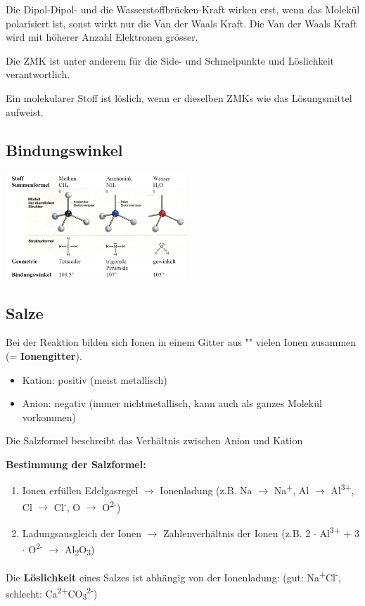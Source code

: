 \vspace{0.2cm}

Die Dipol-Dipol- und die Wasserstoffbrücken-Kraft wirken erst, wenn das Molekül polarisiert ist, sonst wirkt nur die Van der Waals Kraft.
Die Van der Waals Kraft wird mit höherer Anzahl Elektronen grösser.

Die ZMK ist unter anderem für die Side- und Schmelpunkte und Löslichkeit verantwortlich.

Ein molekularer Stoff ist löslich, wenn er dieselben ZMKs wie das Lösungsmittel aufweist.

\subsection{Bindungswinkel}
\begin{center}
	\includegraphics[height=4cm]{images/Winkel.png}
\end{center}


\subsection{Salze}
Bei der Reaktion bilden sich Ionen in einem Gitter aus "" vielen Ionen zusammen (= \textbf{Ionengitter}).
\begin{itemize}
	\item Kation: positiv (meist metallisch)
	\item Anion: negativ (immer nichtmetallisch, kann auch als ganzes Molekül vorkommen)
\end{itemize}

Die Salzformel beschreibt das Verhältnis zwischen Anion und Kation

\textbf{Bestimmung der Salzformel:}
\begin{enumerate}
	\item Ionen erfüllen Edelgasregel $\rightarrow$ Ionenladung (z.B. Na $\rightarrow$ Na\textsuperscript{+}, Al $\rightarrow$ Al\textsuperscript{3+}, Cl $\rightarrow$ Cl\textsuperscript{-}, O $\rightarrow$ O\textsuperscript{2-})
	\item Ladungsausgleich der Ionen $\rightarrow$ Zahlenverhältnis der Ionen (z.B. 2 $\cdot$ Al\textsuperscript{3+} + 3 $\cdot$ O\textsuperscript{2-} $\rightarrow$ Al\textsubscript{2}O\textsubscript{3})
\end{enumerate}
Die \textbf{Löslichkeit} eines Salzes ist abhängig von der Ionenladung:
(gut: Na\textsuperscript{+}Cl\textsuperscript{-}, schlecht: Ca\textsuperscript{2+}CO\textsubscript{3}\textsuperscript{2-})

